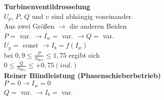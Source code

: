 \textbf{Turbinenventildrosselung}\\
$U_p$, $ P$, $Q$ und $\upsilon$ sind abhängig voneinander. \\
Aus zwei Größen $\rightarrow$ die anderen Beiden\\
\indent $P =$ var. $\rightarrow I_w= $ var. $\rightarrow Q =$ var.\\
\indent $U_p =$ const $\rightarrow I_b = f(I_w)$\\
\indent bei $0,9 \leq \frac{P}{S_{Bez}} \leq 1,75$ ergibt sich\\
\indent $0 \leq \frac{Q}{S_{Bez}} \leq +0,75(ind.)$\\


\textbf{Reiner Blindleistung (Phasenschieberbetrieb)}\\
\indent $P = 0 \rightarrow I_w= 0$ \\
\indent $Q =$ var. $\rightarrow I_b = $ var.
